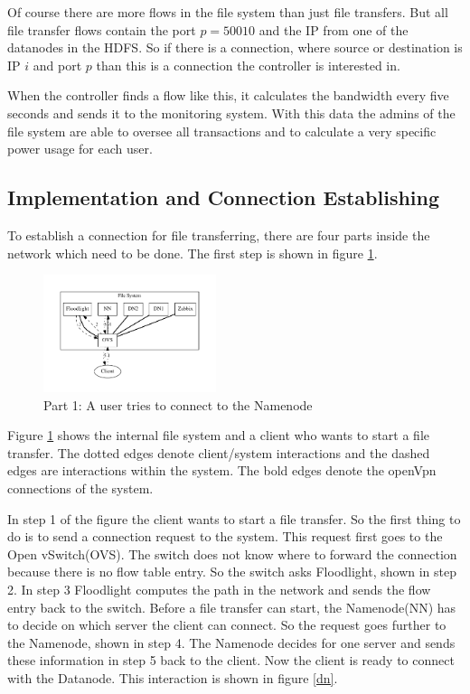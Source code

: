  Of course there are more flows in the file system than just file transfers. But all file transfer flows contain the port $p=50010$ and the IP from one of the datanodes in the HDFS. So if there is a connection, where source or destination is IP $i$ and port $p$ than this is a connection the controller is interested in.
 
 When the controller finds a flow like this, it calculates the bandwidth every five seconds and sends it to the monitoring system. With this data the admins of the file system are able to oversee all transactions and to calculate a very specific power usage for each user. 
 
 \subsection{Implementation and Connection Establishing}               

To establish a connection for file transferring, there are four parts inside the network which need to be done. The first step is shown in figure \ref{nn}.
 
\begin{figure}[htp]
\centering
\includegraphics[width=0.45\textwidth]{img/connectionToNamenode} 
\caption{Part 1: A user tries to connect to the Namenode}
\label{nn}
\end{figure}

Figure \ref{nn} shows the internal file system and a client who wants to start a file transfer. The dotted edges denote client/system interactions and the dashed edges are interactions within the system. The bold edges denote the openVpn connections of the system.

In step 1 of the figure the client wants to start a file transfer. So the first thing to do is to send a connection request to the system. This request first goes to the Open vSwitch(OVS). The switch does not know where to forward the connection because there is no flow table entry. So the switch asks Floodlight, shown in step 2. In step 3 Floodlight computes the path in the network and sends the flow entry back to the switch. Before a file transfer can start, the Namenode(NN) has to decide on which server the client can connect. So the request goes further to the Namenode, shown in step 4. The Namenode decides for one server and sends these information in step 5 back to the client. Now the client is ready to connect with the Datanode. This interaction is shown in figure \ref{dn}.

